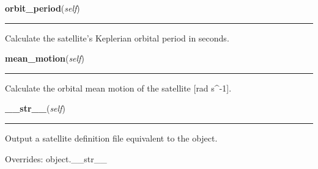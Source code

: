     \label{SatStress:SatStress:Satellite:orbit_period}

    \vspace{0.5ex}

\hspace{.8\funcindent}\begin{boxedminipage}{\funcwidth}

    \raggedright \textbf{orbit\_period}(\textit{self})

    \vspace{-1.5ex}

    \rule{\textwidth}{0.5\fboxrule}
\setlength{\parskip}{2ex}
    Calculate the satellite's Keplerian orbital period in seconds.

\setlength{\parskip}{1ex}
    \end{boxedminipage}

    \label{SatStress:SatStress:Satellite:mean_motion}

    \vspace{0.5ex}

\hspace{.8\funcindent}\begin{boxedminipage}{\funcwidth}

    \raggedright \textbf{mean\_motion}(\textit{self})

    \vspace{-1.5ex}

    \rule{\textwidth}{0.5\fboxrule}
\setlength{\parskip}{2ex}
    Calculate the orbital mean motion of the satellite [rad 
    s{\textasciicircum}-1].

\setlength{\parskip}{1ex}
    \end{boxedminipage}

    \vspace{0.5ex}

\hspace{.8\funcindent}\begin{boxedminipage}{\funcwidth}

    \raggedright \textbf{\_\_str\_\_}(\textit{self})

    \vspace{-1.5ex}

    \rule{\textwidth}{0.5\fboxrule}
\setlength{\parskip}{2ex}
    Output a satellite definition file equivalent to the object.

\setlength{\parskip}{1ex}
      Overrides: object.\_\_str\_\_

    \end{boxedminipage}


